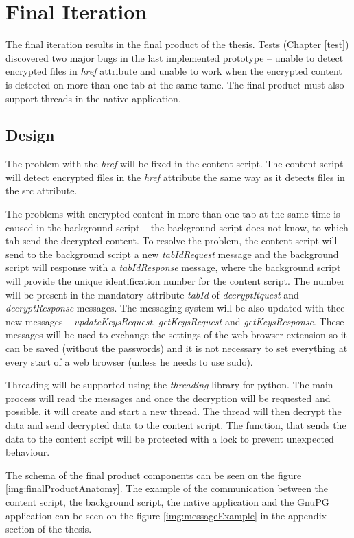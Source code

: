 \section{Final Iteration}
\label{prototype:finalProduct}
The final iteration results in the final product of the thesis. Tests (Chapter \ref{test}) discovered two major bugs in the last implemented prototype -- unable to detect encrypted files in \textit{href} attribute and unable to work when the encrypted content is detected on more than one tab at the same tame. The final product must also support threads in the native application.

\subsection{Design}
The problem with the \textit{href} will be fixed in the content script. The content script will detect encrypted files in the \textit{href} attribute the same way as it detects files in the src attribute.

The problems with encrypted content in more than one tab at the same time is caused in the background script -- the background script does not know, to which tab send the decrypted content. To resolve the problem, the content script will send to the background script a new \textit{tabIdRequest} message and the background script will response with a \textit{tabIdResponse} message, where the background script will provide the unique identification number for the content script. The number will be present in the mandatory attribute \textit{tabId} of \textit{decryptRquest} and \textit{decryptResponse} messages. The messaging system will be also updated with thee new messages -- \textit{updateKeysRequest}, \textit{getKeysRequest} and \textit{getKeysResponse}. These messages will be used to exchange the settings of the web browser extension so it can be saved (without the passwords) and it is not necessary to set everything at every start of a web browser (unless he needs to use sudo).

Threading will be supported using the \textit{threading} library for python. The main process will read the messages and once the decryption will be requested and possible, it will create and start a new thread. The thread will then decrypt the data and send decrypted data to the content script. The function, that sends the data to the content script will be protected with a lock to prevent unexpected behaviour.

The schema of the final product components can be seen on the figure \ref{img:finalProductAnatomy}. The example of the communication between the content script, the background script, the native application and the GnuPG application can be seen on the figure \ref{img:messageExample} in the appendix section of the thesis.

